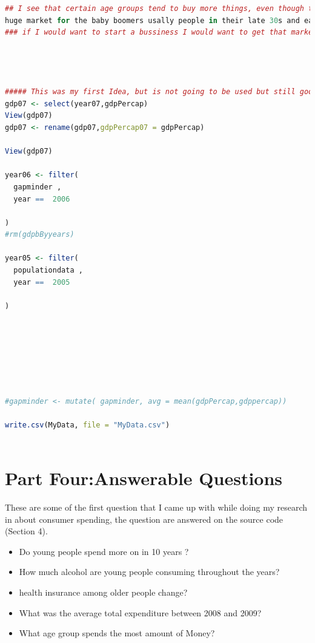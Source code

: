 \documentclass[11pt]{article}
\begin{document}
\begin{lstlisting}[language=R]
## I see that certain age groups tend to buy more things, even though there are is 
huge market for the baby boomers usally people in their late 30s and early 40 tend to spend the most
### if I would want to start a bussiness I would want to get that markets. 




##### This was my first Idea, but is not going to be used but still good code for future refrence
gdp07 <- select(year07,gdpPercap)
View(gdp07)
gdp07 <- rename(gdp07,gdpPercap07 = gdpPercap)

View(gdp07)
  
year06 <- filter(
  gapminder ,
  year ==  2006
  
)  
#rm(gdpbByyears)   

year05 <- filter(
  populationdata ,
  year ==  2005
  
)







#gapminder <- mutate( gapminder, avg = mean(gdpPercap,gdppercap))

write.csv(MyData, file = "MyData.csv")



\end{lstlisting}




\section{Part Four:Answerable Questions}


These are some of the first question that I came up with while doing my research in about consumer spending, the question are answered on the source code (Section 4).  
\begin{itemize}
\item Do young  people  spend more on in  10  years ?
\item How much alcohol are young people consuming throughout the years? 
\item health insurance among older people change?  
\item  What was the average total expenditure between 2008 and 2009?
\item What age group spends the most amount of Money?
\end{itemize}
\end{document}
